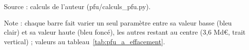 Source : calculs de l'auteur (pfu/calculs\_pfu.py).\par Note : chaque barre fait varier un seul paramètre entre sa valeur basse (bleu clair) et sa valeur haute (bleu foncé), les autres restant au centre (3,6 Md\euro{}, trait vertical) ; valeurs au tableau~\ref{tab:pfu_a_effacement}.
